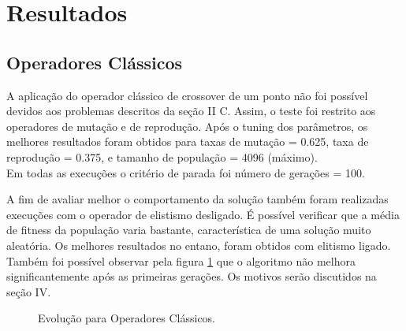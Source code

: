 \documentclass[conference]{IEEEtran}
\begin{document}
\section{Resultados}

\subsection{Operadores Clássicos}
A aplicação do operador clássico de crossover de um ponto não foi possível devidos aos problemas descritos da seção II C. Assim, o teste foi restrito aos operadores de mutação e de reprodução. Após o tuning dos parâmetros, os melhores resultados foram obtidos para taxas de mutação = 0.625, taxa de reprodução = 0.375, e tamanho de população = 4096 (máximo).\\
Em todas as execuções o critério de parada foi número de gerações = 100.

A fim de avaliar melhor o comportamento da solução também foram realizadas execuções com o operador de elistismo desligado. É possível verificar que a média de fitness da população varia bastante, característica de uma solução muito aleatória. Os melhores resultados no entano, foram obtidos com elitismo ligado. Também foi possível observar pela figura \ref{classical} que o algoritmo não melhora significantemente após as primeiras gerações. Os motivos serão discutidos na seção IV.

\begin{figure}[!t]
\centering
{}
\hfil
{}
\caption{Evolução para Operadores Clássicos.}
\label{classical}
\end{figure}
\end{document}
